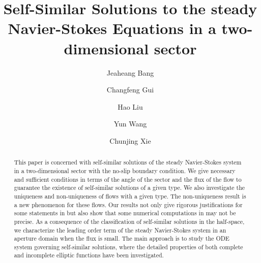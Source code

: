 \documentclass[reqno,12pt]{amsart}
\begin{document}
\title[Self-Similar Solutions with Physical Boundaries]{Self-Similar Solutions to the steady Navier-Stokes Equations in a two-dimensional sector}

	\author{Jeaheang Bang}
	\address{Institute for Theoretical Sciences, Westlake University, China}
	
	
	\author{Changfeng Gui}
	\address{Department of Mathematics, Faculty of Science and Technology, University of Macau, Taipa, Macao}
	
	\author{Hao Liu}
	\address{School of Mathematical Sciences and Institute of Natural Sciences, Shanghai Jiao Tong University, 800 Dongchuan Road, Shanghai, China}
	
	\author{Yun Wang}
	\address{School of Mathematical Sciences, Center for dynamical systems and differential equations, Soochow University, Suzhou, China}
	
	
	
	
	\author{Chunjing Xie}
	\address{School of Mathematical Sciences, Institute of Natural Sciences,
		Ministry of Education Key Laboratory of Scientific and Engineering Computing,
		and CMA-Shanghai, Shanghai Jiao Tong University, 800 Dongchuan Road, Shanghai, China}

\begin{abstract}
This paper is concerned with self-similar solutions of the steady Navier-Stokes system in a two-dimensional sector with the no-slip boundary condition. 
We give necessary and sufficient conditions in terms of the angle of the sector and the flux of the flow to guarantee the existence of self-similar solutions of a given type.
We also investigate the uniqueness and non-uniqueness of flows with a given type.
The non-uniqueness result is a new phenomenon for these flows.
 Our results not only give rigorous justifications for some statements in \cite{Rosenhead40} but also show that some numerical computations in \cite{Rosenhead40} may not be precise.  
  As a consequence of the classification of self-similar solutions in the half-space, we characterize the leading order term of the steady Navier-Stokes system in an aperture domain when the flux is small. 
   The main approach is to study the ODE system governing self-similar solutions, where the detailed properties of both complete and incomplete elliptic functions have been investigated.
\end{abstract}
\end{document}
